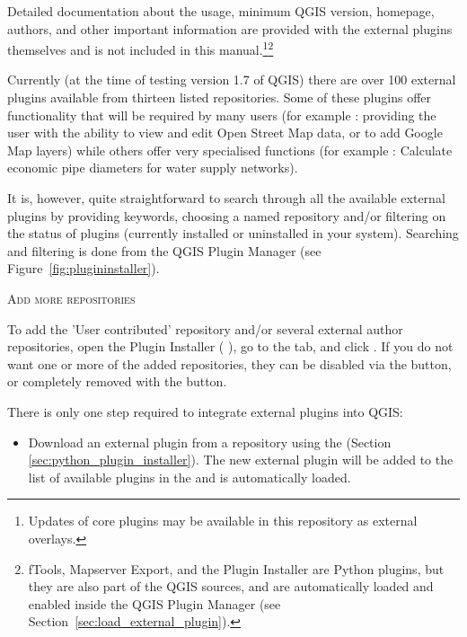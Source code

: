 Detailed documentation about the usage, minimum QGIS version, homepage, authors,
and other important information are provided with the external plugins themselves
and is not included in this manual.\footnote{Updates of core plugins may be
available in this repository as external overlays.}\footnote{fTools, Mapserver 
Export, and the Plugin Installer are Python plugins, but they are also part of 
the QGIS sources, and are automatically loaded and enabled inside the QGIS 
Plugin Manager (see Section~\ref{sec:load_external_plugin}).}

Currently (at the time of testing version 1.7 of QGIS) there are over 100 external 
plugins available from thirteen listed repositories. Some of these plugins offer
functionality that will be required by many users (for example : providing the user 
with the ability to view and edit Open Street Map data, or to add Google Map layers)
while others offer very specialised functions (for example : Calculate economic pipe diameters
for water supply networks).

It is, however, quite straightforward to search through all the available external plugins
by providing keywords, choosing a named repository and/or filtering on the status of plugins 
(currently installed or uninstalled in your system). Searching and filtering is done from the 
QGIS Plugin Manager (see Figure~\ref{fig:plugininstaller}).


\begin{Tip} \caption{\textsc{Add more repositories}}
To add the 'User contributed' repository and/or several external author repositories, open the
Plugin Installer ( \arrow {}),
go to the  tab, and click .
If you do not want one or more of the added repositories, they can be disabled via the
 button, or completely removed with the  button.
\end{Tip}

There is only one step required to integrate external plugins into QGIS:

\begin{itemize}[label=--]
\item Download an external plugin from a repository using the
 (Section \ref{sec:python_plugin_installer}).
The new external plugin will be added to the list of available plugins in
the  and is automatically loaded.
\end{itemize}

